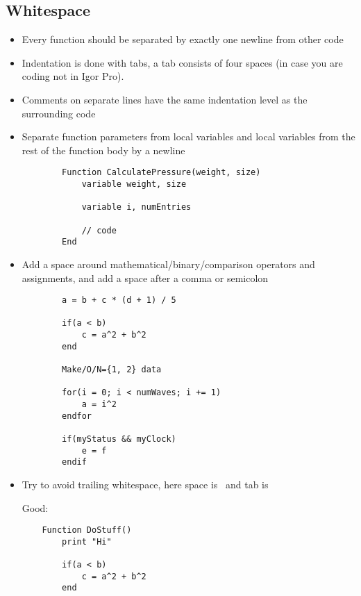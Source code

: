\documentclass{scrartcl}
\begin{document}
\subsection*{Whitespace}
%
\begin{itemize}
	\item Every function should be separated by exactly one newline from other code
%	
	\item Indentation is done with tabs, a tab consists of four spaces (in case you are coding not in Igor Pro).
%	
	\item Comments on separate lines have the same indentation level as the surrounding code
%	
	\item Separate function parameters from local variables and local variables from the rest of the function body by a newline
	\begin{verbatim}
		Function CalculatePressure(weight, size)
			variable weight, size
		
			variable i, numEntries
			
			// code
		End
	\end{verbatim}
%	
	\item Add a space around mathematical/binary/comparison operators and assignments, and add a space after a comma or semicolon
	\begin{verbatim}
		a = b + c * (d + 1) / 5
	
		if(a < b)
			c = a^2 + b^2
		end
	
		Make/O/N={1, 2} data
		
		for(i = 0; i < numWaves; i += 1)
			a = i^2
		endfor
		
		if(myStatus && myClock)
			e = f
		endif
	\end{verbatim}
%	
	\item Try to avoid trailing whitespace, here space is \FancyVerbSpace\normalfont\ and tab is \FancyVerbTab\par
	Good:\par
	\begin{verbatim}
	Function DoStuff()
		print "Hi"
		
		if(a < b)
			c = a^2 + b^2
		end
		

\end{verbatim}
\end{itemize}
\end{document}
